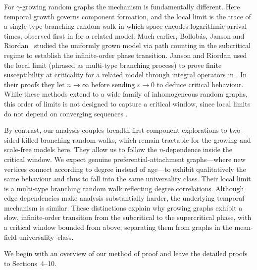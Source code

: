 \documentclass[a4paper, a4wide, 10pt, reqno]{amsart}
\theoremstyle{plain}
\theoremstyle{definition}
\numberwithin{equation}{section}
\begin{document}
\smallskip 
For $\gamma$-growing random graphs the mechanism is fundamentally different. Here temporal growth governs component formation, and the local limit is the trace of a single-type branching random walk in which space encodes logarithmic arrival times, {observed first in \cite{DerMor13} for a related model}. {Much earlier, Bollob\'as, Janson and Riordan~\cite{BJR05}
studied} the uniformly grown model via path counting in the subcritical regime to establish the infinite-order phase transition. Janson and Riordan
used the local limit {(phrased as multi-type branching process)} to prove finite susceptibility at criticality for a related model through integral operators in \cite{JansonRiordanSus}. In their proofs they let $n\to\infty$ before sending $\varepsilon\to0$ to deduce critical behaviour. While these methods extend to a wide family of inhomogeneous random graphs, this order of limits is not designed to capture a critical window, since local limits do not depend on converging sequences .%
\smallskip

\pagebreak[3]

By contrast, our analysis couples breadth-first component explorations to two-sided killed branching random walks, which remain tractable for the growing and scale-free models here. They allow us to follow the $n$-dependence  inside the critical window. We expect genuine preferential-attachment graphs---where new vertices connect according to degree instead of age---to exhibit qualitatively the same behaviour and thus to fall into the same universality class. Their local limit is a multi-type branching random walk \cite{BBCSLocalLimitPA,DerMor13, garavaglia2022universality} reflecting degree correlations. Although edge dependencies make analysis substantially harder, the underlying temporal mechanism is similar. 
These distinctions explain why growing graphs exhibit a slow, infinite-order transition from the subcritical to the supercritical phase, with a critical window
bounded from above, separating them from graphs in the mean-field universality~class.\smallskip



We begin with an overview of our method of proof and leave the detailed proofs to Sections~4--10. \pagebreak[3]
\smallskip 
\end{document}
